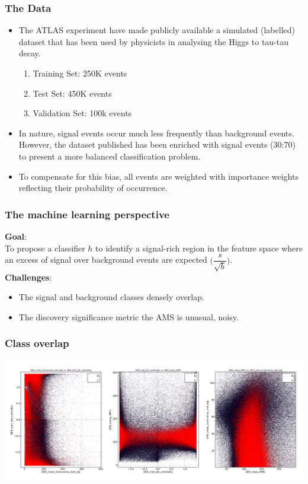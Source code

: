 \documentclass[pdf]{beamer}
\begin{document}
\begin{frame}
\frametitle{The Data}
\begin{itemize}
	\item<1-> The ATLAS experiment have made publicly available a simulated (labelled) dataset that has been used by physicists in analysing the Higgs  to tau-tau decay. 
	\begin{enumerate}
	\item Training Set: 250K events
	\item Test Set: 450K events
	\item Validation Set: 100k events
\end{enumerate}	  
	\item<2-> In nature, signal events occur much less frequently than background events. However, the dataset published has been enriched with signal events (30:70) to present a more balanced classification problem. 
	\item<3-> To compensate for this bias, all events
are weighted with importance weights reflecting their probability of occurrence.
\end{itemize}
\end{frame}

\begin{frame}
\frametitle{The machine learning perspective}
\textbf{Goal}:\\

To propose a classifier $h$ to identify a signal-rich region in the feature space where an excess of signal over background events are expected $\bigg(\dfrac{s}{\sqrt{b}}\bigg)$.\\
\bigskip
\textbf{Challenges}:\\
\begin{itemize}
\item The signal and background classes densely overlap.
\item The discovery significance metric the AMS is unusual, noisy. 
\end{itemize}
\end{frame}

\begin{frame}
\frametitle{Class overlap}
\hspace*{-10mm}
\includegraphics[scale=0.25]{top_bi_features.png}
\end{frame}
\end{document}
